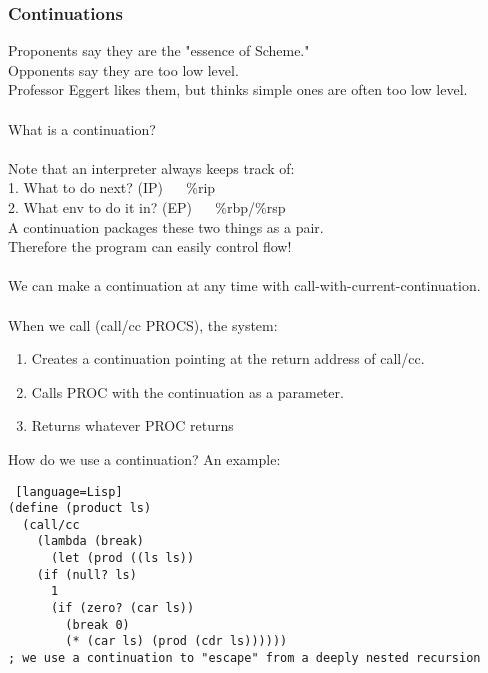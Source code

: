 \documentclass[../../lecture_notes.tex]{subfiles}
\begin{document}
\subsubsection*{Continuations}
\noindent Proponents say they are the "essence of Scheme."\\
\noindent Opponents say they are too low level.\\
\noindent Professor Eggert likes them, but thinks simple ones are often too low level.\\
\\
What is a continuation?\\
\\
 Note that an interpreter always keeps track of:\\
 1. What to do next? (IP) ~~ \%rip\\
 2. What env to do it in? (EP) ~~ \%rbp/\%rsp\\
 A continuation packages these two things as a pair.\\
 Therefore the program can easily control flow!\\
\\
We can make a continuation at any time with call-with-current-continuation.\\
\\
 When we call (call/cc PROCS), the system:\\
 \begin{enumerate} [itemsep=0mm]
	\item Creates a continuation pointing at the return address of call/cc.
	\item Calls PROC with the continuation as a parameter.
	\item Returns whatever PROC returns
\end{enumerate}

\noindent How do we use a continuation? An example:
\begin{lstlisting} [language=Lisp]
(define (product ls)
  (call/cc
    (lambda (break)
      (let (prod ((ls ls))
	(if (null? ls)
	  1
	  (if (zero? (car ls))
	    (break 0)
	    (* (car ls) (prod (cdr ls))))))
; we use a continuation to "escape" from a deeply nested recursion
\end{lstlisting}
\end{document}
